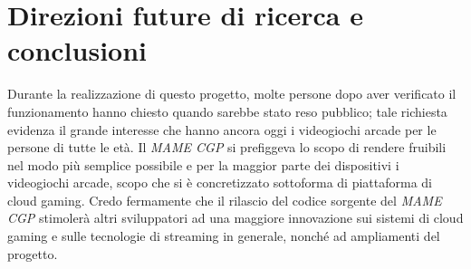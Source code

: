 %
%

\chapter*{Direzioni future di ricerca e conclusioni}


Durante la realizzazione di questo progetto, molte persone dopo aver verificato il funzionamento hanno chiesto quando sarebbe stato reso pubblico; tale richiesta evidenza il grande interesse che hanno ancora oggi i videogiochi arcade per le persone di tutte le età. Il \textit{MAME CGP} si prefiggeva lo scopo di rendere fruibili nel modo più semplice possibile e per la maggior parte dei dispositivi i videogiochi arcade, scopo che si è concretizzato sottoforma di piattaforma di cloud gaming. Credo fermamente che il rilascio del codice sorgente del \textit{MAME CGP} stimolerà altri sviluppatori ad una maggiore innovazione sui sistemi di cloud gaming e sulle tecnologie di streaming in generale, nonché ad ampliamenti del progetto.


